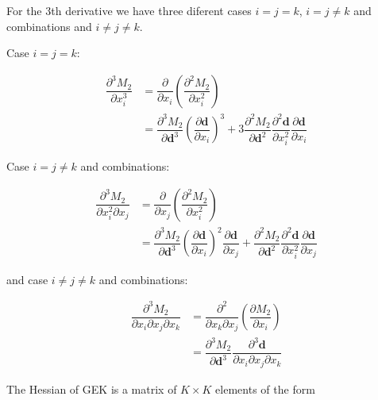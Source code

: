 \documentclass[aps,prb,twocolumn,superscriptaddress,floatfix,longbibliography,10pt]{revtex4-2}
\begin{document}
For the 3th derivative we have three diferent cases $i=j=k$, $i=j\ne k$ and combinations and $i\ne j\ne k$. 

\vspace{2mm}

Case $i = j = k$:

\begin{equation} \label{eqn:Cmatd3}
\begin{split}
\dfrac{\partial^3 M_2}{\partial x_i^3} & = \dfrac{\partial}{\partial x_i} \left(\dfrac{\partial^2 M_2}{\partial x_i^2}\right) \\
& = \dfrac{\partial^3 M_2}{\partial\mathbf{d}^3}\left(\dfrac{\partial\mathbf{d}}{\partial x_i}\right)^3 +  3\dfrac{\partial^2 M_2}{\partial\mathbf{d}^2}\dfrac{\partial^2\mathbf{d}}{\partial x_i^2}\dfrac{\partial\mathbf{d}}{\partial x_i}
\end{split}
\end{equation}

Case $i = j \ne k$ and combinations:

\begin{equation} \label{eqn:hd3}
\begin{split}
\dfrac{\partial^3 M_2}{\partial x_i^2\partial x_j} & = \dfrac{\partial}{\partial x_j} \left(\dfrac{\partial^2 M_2}{\partial x_i^2}\right) \\
& = \dfrac{\partial^3 M_2}{\partial\mathbf{d}^3}\left(\dfrac{\partial\mathbf{d}}{\partial x_i}\right)^2 \dfrac{\partial\mathbf{d}}{\partial x_j} +  \dfrac{\partial^2 M_2}{\partial\mathbf{d}^2}\dfrac{\partial^2\mathbf{d}}{\partial x_i^2}\dfrac{\partial\mathbf{d}}{\partial x_j}
\end{split}
\end{equation}

and case $i \ne j \ne k$ and combinations:

\begin{equation} \label{eqn:hd3-2}
\begin{split}
\dfrac{\partial^3 M_2}{\partial x_i\partial x_j\partial x_k} & = \dfrac{\partial^2}{\partial x_k\partial x_j} \left(\dfrac{\partial M_2}{\partial x_i}\right) \\
& = \dfrac{\partial^3 M_2}{\partial\mathbf{d}^3}\dfrac{\partial^3\mathbf{d}}{\partial x_i\partial x_j\partial x_k}
\end{split}
\end{equation}

The Hessian of GEK is a matrix of $K \times K$ elements of the form 
\end{document}
